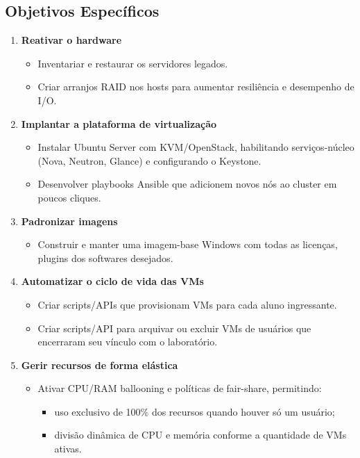 \subsection{Objetivos Específicos}
\begin{enumerate}
    \item \textbf{Reativar o hardware}
    \begin{itemize}
        \item Inventariar e restaurar os servidores legados.
        \item Criar arranjos RAID nos hosts para aumentar resiliência e desempenho de I/O.
    \end{itemize}
    
    \item \textbf{Implantar a plataforma de virtualização}
    \begin{itemize}
        \item Instalar Ubuntu Server com KVM/OpenStack, habilitando serviços-núcleo (Nova, Neutron, Glance) e configurando o Keystone.
        \item Desenvolver playbooks Ansible que adicionem novos nós ao cluster em poucos cliques.
    \end{itemize}
    
    \item \textbf{Padronizar imagens}
    \begin{itemize}
        \item Construir e manter uma imagem-base Windows com todas as licenças, plugins dos softwares desejados.
    \end{itemize}
    
    \item \textbf{Automatizar o ciclo de vida das VMs}
    \begin{itemize}
        \item Criar scripts/APIs que provisionam VMs para cada aluno ingressante.
        \item Criar scripts/API para arquivar ou excluir VMs de usuários que encerraram seu vínculo com o laboratório.
    \end{itemize}
    
    \item \textbf{Gerir recursos de forma elástica}
    \begin{itemize}
        \item Ativar CPU/RAM ballooning e políticas de fair-share, permitindo:
        \begin{itemize}
            \item uso exclusivo de 100\% dos recursos quando houver só um usuário;
            \item divisão dinâmica de CPU e memória conforme a quantidade de VMs ativas.
        \end{itemize}
    \end{itemize}
    

\end{enumerate}
